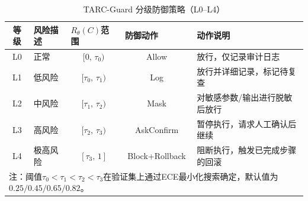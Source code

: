 \begin{table}[htbp]
\centering
\caption{TARC-Guard 分级防御策略（L0--L4）}
\label{tab:risk_levels}
\small
\begin{tabular}{clccp{4.2cm}}
\toprule
\textbf{等级} & \textbf{风险描述} & \multicolumn{1}{l}{\textbf{$R_\theta(C)$范围}} & \multicolumn{1}{l}{\textbf{防御动作}} & \raggedright\arraybackslash\textbf{动作说明} \\
\midrule
L0 & 正常 & $[0,\,\tau_0)$ & Allow & 放行，仅记录审计日志 \\
L1 & 低风险 & $[\tau_0,\,\tau_1)$ & Log & 放行并详细记录，标记待复查 \\
L2 & 中风险 & $[\tau_1,\,\tau_2)$ & Mask & 对敏感参数/输出进行脱敏后放行 \\
L3 & 高风险 & $[\tau_2,\,\tau_3)$ & AskConfirm & 暂停执行，请求人工确认后继续 \\
L4 & 极高风险 & $[\tau_3,\,1]$ & Block+Rollback & 阻断执行，触发已完成步骤的回滚 \\
\bottomrule
\multicolumn{5}{l}{\footnotesize 注：阈值$\tau_0 < \tau_1 < \tau_2 < \tau_3$在验证集上通过ECE最小化搜索确定，默认值为$0.25/0.45/0.65/0.82$。} \\
\end{tabular}
\end{table}
